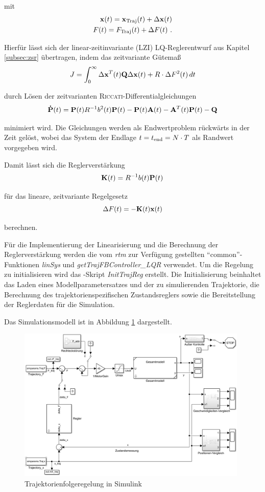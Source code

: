mit 
\begin{align*}
	\boldsymbol{\mathrm{x}}(t) = \boldsymbol{\mathrm{x}}_{\mathrm{Traj}}(t) + \Delta \boldsymbol{\mathrm{x}}(t) \\
	 F(t) = F_{\mathrm{Traj}}(t) + \Delta F(t) \ .
\end{align*}

Hierfür lässt sich der linear-zeitinvariante (LZI) LQ-Reglerentwurf aus Kapitel \ref{subsec:zsr} übertragen, indem das zeitvariante Gütemaß 
	\[
	J = \int_{0}^{\infty} \Delta \boldsymbol{\mathrm{x}}^T(t) {\boldsymbol{\mathrm{Q}}} \Delta \boldsymbol{\mathrm{x}}(t) + R \cdot \Delta F^2(t) \, dt
\]

durch Lösen der zeitvarianten \textsc{Riccati}-Differentialgleichungen
	\[
	{\boldsymbol{\mathrm{\dot{P}}}}(t) = {\boldsymbol{\mathrm{P}}}(t) R^{-1} b^2(t) {\boldsymbol{\mathrm{P}}}(t) - {\boldsymbol{\mathrm{P}}}(t) {\boldsymbol{\mathrm{A}}}(t) - {\boldsymbol{\mathrm{A}}}^T(t) {\boldsymbol{\mathrm{P}}}(t) - {\boldsymbol{\mathrm{Q}}}
\]

minimiert wird. Die Gleichungen werden als Endwertproblem rückwärts in der Zeit gelöst, wobei das System der Endlage $t=t_{\mathrm{end}} = N \cdot T$ als Randwert vorgegeben wird. 

Damit lässt sich die Reglerverstärkung 
	\[
	{\boldsymbol{\mathrm{K}}}(t) = R^{-1} b(t) {\boldsymbol{\mathrm{P}}}(t)
\]

für das lineare, zeitvariante Regelgesetz
	\[
	\Delta F(t) = -{\boldsymbol{\mathrm{K}}}(t) \boldsymbol{\mathrm{x}}(t)
\]

berechnen.

Für die Implementierung der Linearisierung und die Berechnung der Reglerverstärkung werden die vom \emph{rtm} zur Verfügung gestellten "`common"'-Funktionen \textit{linSys} und \textit{getTrajFBController\_LQR} verwendet. Um die Regelung zu initialisieren wird das \Matlab-Skript \textit{InitTrajReg} erstellt. Die Initialisierung beinhaltet das Laden eines Modellparametersatzes und der zu simulierenden Trajektorie, die Berechnung des trajektorienspezifischen Zustandsreglers sowie die Bereitstellung der Reglerdaten für die Simulation. 

Das Simulationsmodell ist in Abbildung \ref{fig:TFR_Simulink} dargestellt.

\begin{figure}[h]
	\centering
		\includegraphics[width=0.98\textwidth]{Bilder/Trajektorien/TFR_Simulink.PNG}
	\caption{Trajektorienfolgeregelung in Simulink}
	\label{fig:TFR_Simulink}
\end{figure}

